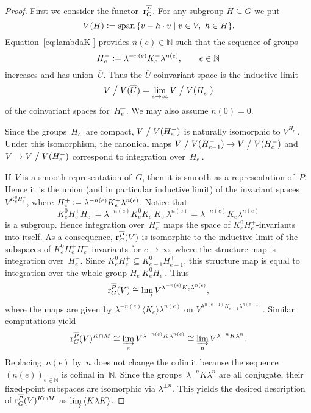 \documentclass{amsart}
\theoremstyle{remark}
\theoremstyle{definition}
\DeclareMathOperator{\spann}{span}%
\newcommand*{\Jacr}{\textup r}%
\newcommand*{\nb}{\nobreakdash}%
\newcommand*{\defeq}{\mathrel{\vcentcolon=}}%
\newcommand*{\idem}[1]{\langle#1\rangle}%
\newcommand*{\opp}[1]{\overline{#1}}%
\newcommand*{\N}{\mathbb N}%
\begin{document}
\begin{proof}
  First we consider the functor~\(\Jacr_G^{\opp{P}}\).  For any subgroup \(H \subseteq G\) we put
  \[
  V(H) \defeq \spann {}\{ v - h \cdot v \mid v\in V,\ h\in H \}.
  \]
  Equation~\eqref{eq:lambdaK-} provides \(n(e)\in\N\) such that the sequence of groups
  \[
  H_e^- \defeq \lambda^{-n(e)} K_e^- \lambda^{n(e)},\qquad e\in\N
  \]
  increases and has union~\(\opp{U}\).  Thus the \(\opp{U}\)\nb-coinvariant space is the inductive limit
  \[
  V \bigm/ V(\opp{U}) = \lim_{e\to\infty} V \bigm/ V(H_e^-)
  \]
  of the coinvariant spaces for~\(H_e^-\).  We may also assume \(n(0)=0\).

  Since the groups~\(H_e^-\) are compact, \(V \bigm/ V (H_e^-)\) is naturally isomorphic to \(V^{H_e^-}\).  Under this isomorphism, the canonical maps \(V \bigm/ V (H_{e-1}^-) \to V \bigm/ V(H_e^-)\) and \(V\to V \bigm/ V(H_e^-)\) correspond to integration over~\(H_e^-\).

  If~\(V\) is a smooth representation of~\(G\), then it is smooth as a representation of~\(P\).  Hence it is the union (and in particular inductive limit) of the invariant spaces~\(V^{K^0_e H_e^+}\), where \(H_e^+ \defeq \lambda^{-n(e)} K_e^+ \lambda^{n(e)}\).  Notice that
  \[
  K^0_e H_e^+ H_e^- = \lambda^{-n(e)} K^0_e K^+_e K_e^- \lambda^{n(e)} =
  \lambda^{-n(e)} K_e \lambda^{n(e)}
  \]
  is a subgroup.  Hence integration over~\(H_e^-\) maps the space of \(K^0_e H_e^+\)\nb-invariants into itself.  As a consequence, \(\Jacr_G^{\opp{P}}(V)\) is isomorphic to the inductive limit of the subspaces of \(K^0_e H_e^+ H_e^-\)-invariants for \(e\to\infty\), where the structure map is integration over~\(H_e^-\).  Since \(K^0_e H^+_e \subseteq K^0_{e-1} H^+_{e-1}\), this structure map is equal to integration over the whole group \(H^-_e K^0_e H^+_e\).  Thus
  \[
  \Jacr_G^{\opp{P}} (V) \cong \varinjlim V^{\lambda^{-n(e)} K_e \lambda^{n(e)}},
  \]
  where the maps are given by \(\lambda^{-n(e)}\idem{K_e}\lambda^{n(e)}\) on \(V^{\lambda^{n(e-1)}K_{e-1}\lambda^{n(e-1)}}\).  Similar computations yield
  \[
  \Jacr_G^{\opp{P}}(V)^{K \cap M}
  \cong \varinjlim_e V^{\lambda^{-n(e)} K \lambda^{n(e)}}
  \cong \varinjlim_n V^{\lambda^{-n}K \lambda^n}.
  \]
  Replacing~\(n(e)\) by~\(n\) does not change the colimit because the sequence~\((n(e))_{e\in\N}\) is cofinal in~\(\N\).  Since the groups~\(\lambda^{-n}K \lambda^n\) are all conjugate, their fixed-point subspaces are isomorphic via \(\lambda^{\pm n}\).  This yields the desired description of \(\Jacr_G^{\opp{P}}(V)^{K \cap M}\) as \(\varinjlim {}\idem{K \lambda K}\).


\end{proof}
\end{document}
